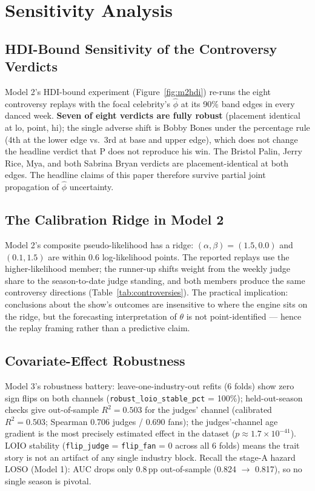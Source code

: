 \documentclass[10pt]{article}
\begin{document}
\section{Sensitivity Analysis}
\label{sec:sensitivity}

\subsection{HDI-Bound Sensitivity of the Controversy Verdicts}

Model 2's HDI-bound experiment (Figure~\ref{fig:m2hdi}) re-runs the eight controversy
replays with the focal celebrity's $\hat\phi$ at its 90\% band edges in every danced week.
\textbf{Seven of eight verdicts are fully robust} (placement identical at lo, point, hi);
the single adverse shift is Bobby Bones under the percentage rule (4th at the lower edge
vs.\ 3rd at base and upper edge), which does not change the headline verdict that P does
not reproduce his win. The Bristol Palin, Jerry Rice, Mya, and both Sabrina Bryan verdicts
are placement-identical at both edges. The headline claims of this paper therefore survive
partial joint propagation of $\hat\phi$ uncertainty.

\subsection{The Calibration Ridge in Model 2}

Model 2's composite pseudo-likelihood has a ridge: $(\alpha, \beta) = (1.5, 0.0)$ and
$(0.1, 1.5)$ are within 0.6 log-likelihood points. The reported replays use the
higher-likelihood member; the runner-up shifts weight from the weekly judge share to the
season-to-date judge standing, and both members produce the same controversy directions
(Table~\ref{tab:controversies}). The practical implication: conclusions about the show's
outcomes are insensitive to where the engine sits on the ridge, but the forecasting
interpretation of $\theta$ is not point-identified --- hence the replay framing rather than
a predictive claim.

\subsection{Covariate-Effect Robustness}

Model 3's robustness battery: leave-one-industry-out refits (6 folds) show zero sign flips
on both channels (\texttt{robust\_loio\_stable\_pct} = 100\%); held-out-season checks give
out-of-sample $R^2 = 0.503$ for the judges' channel (calibrated $R^2 = 0.503$; Spearman
0.706 judges / 0.690 fans); the judges'-channel age gradient is the most precisely
estimated effect in the dataset ($p \approx 1.7\times10^{-41}$). LOIO stability
(\texttt{flip\_judge} = \texttt{flip\_fan} = 0 across all 6 folds) means the trait story is
not an artifact of any single industry block. Recall the stage-A hazard LOSO (Model 1):
AUC drops only 0.8\,pp out-of-sample (0.824 $\to$ 0.817), so no single season is pivotal.
\end{document}
